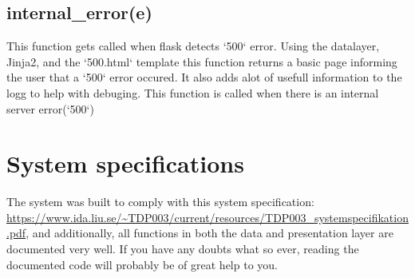 \documentclass{TDP003mall}
\begin{document}
\subsection{internal\_error(e)}
This function gets called when flask detects `500` error. Using the datalayer, Jinja2, and the `500.html` template this function returns a basic page informing the user that a `500` error occured.
It also adds alot of usefull information to the logg to help with debuging.
This function is called when there is an internal server error(`500`)

\section{System specifications}\label{system-specs}
The system was built to comply with this system specification: \url{https://www.ida.liu.se/~TDP003/current/resources/TDP003_systemspecifikation.pdf}, and additionally, all functions in both the data and presentation layer are documented very well. If you have any doubts what so ever, reading the documented code will probably be of great help to you.
\end{document}

